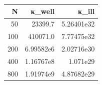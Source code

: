 \begin{tabular}{rrr}
  \toprule
  \textbf{N} & \textbf{κ\_well} & \textbf{κ\_ill} \\
  \midrule
  50 & 23399.7 & 5.26401e32 \\
  100 & 410071.0 & 7.77475e32 \\
  200 & 6.99582e6 & 2.02716e30 \\
  400 & 1.16767e8 & 1.071e29 \\
  800 & 1.91974e9 & 4.87682e29 \\
  \bottomrule
\end{tabular}
